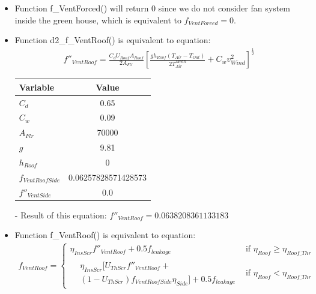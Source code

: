 \documentclass[a4paper]{article}
\numberwithin{equation}{section}
\begin{document}
\begin{itemize}
  \item Function f\_VentForced() will return \(0\) since we do not consider fan system inside the green house, which is equivalent to \(f_{VentForced} = 0\). \label{fVentForced}

  \item Function d2\_f\_VentRoof() is equivalent to equation:
        \begin{align*}
          f''_{VentRoof} = \frac{C_d U_{Roof} A_{Roof}}{2A_{Flr}} {\left[\frac{gh_{Roof}(T_{Air} - T_{Out})}{2T^{Mean}_{Air}} + C_w v^2_{Wind}\right]}^{ \frac{1}{2}}
        \end{align*}

        \begin{table}[H]
          \centering
          \begin{tabular}{@{}lS[table-format=5.17]@{}}
            \toprule
            \textbf{Variable}    & \textbf{Value}      \\
            \midrule
            \(C_d\)              & 0.65                \\
            \(C_w\)              & 0.09                \\
            \(A_{Flr}\)          & 70000               \\
            \(g\)                & 9.81                \\
            \(h_{Roof}\)         & 0                   \\
            \(f_{VentRoofSide}\) & 0.06257828571428573 \\
            \(f''_{VentSide}\)   & 0.0                 \\
            \bottomrule
          \end{tabular}
        \end{table}

  \item[-] Result of this equation: \(f''_{VentRoof} = 0.0638208361133183\)

  \item Function f\_VentRoof() is equivalent to equation:\label{fVentRoof}
        \begin{gather*}
          f_{VentRoof} =
          \begin{cases}
            \eta_{InsScr} f''_{VentRoof} + 0.5f_{leakage} & \text{if~} \eta_{Roof} \geq \eta_{Roof\_Thr} \\
            \begin{split}
              & \eta_{InsScr} [U_{ThScr}f''_{VentRoof} + \\
              & (1-U_{ThScr})f_{VentRoofSide} \eta_{Side}] + 0.5 f_{leakage}
            \end{split}                   & \text{if~}  \eta_{Roof} < \eta_{Roof\_Thr}
          \end{cases}
        \end{gather*}


\end{itemize}
\end{document}
